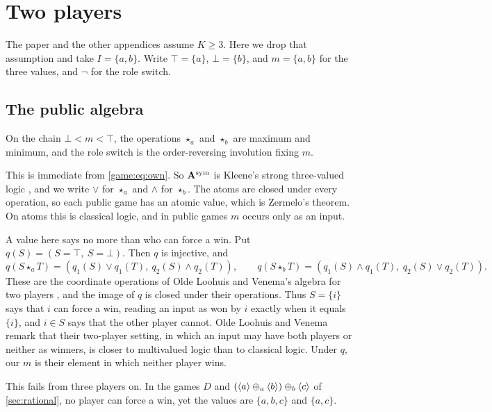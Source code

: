 \section{Two players}\label{app:two-players}

The paper and the other appendices assume $K\geq3$. Here we drop that assumption and take $I=\{a,b\}$. Write $\top=\{a\}$, $\bot=\{b\}$, and $m=\{a,b\}$ for the three values, and $\lnot$ for the role switch.

\subsection{The public algebra}

\begin{proposition}\label{two:prop:kleene}
On the chain $\bot<m<\top$, the operations $\star_a$ and $\star_b$ are maximum and minimum, and the role switch is the order-reversing involution fixing $m$.
\end{proposition}

This is immediate from \eqref{game:eq:own}. So $\mathbf A^{\rm sym}$ is Kleene's strong three-valued logic \cite{Kleene1952}, and we write $\lor$ for $\star_a$ and $\land$ for $\star_b$. The atoms are closed under every operation, so each public game has an atomic value, which is Zermelo's theorem. On atoms this is classical logic, and in public games $m$ occurs only as an input.

A value here says no more than who can force a win. Put $q(S)=(S=\top,\ S=\bot)$. Then $q$ is injective, and
\[
 q(S\star_a T)=(q_1(S)\lor q_1(T),\ q_2(S)\land q_2(T)),\qquad
 q(S\star_b T)=(q_1(S)\land q_1(T),\ q_2(S)\lor q_2(T)).
\]
These are the coordinate operations of Olde Loohuis and Venema's algebra for two players \cite[Definition~3.20]{OldeLoohuisVenema2010}, and the image of $q$ is closed under their operations. Thus $S=\{i\}$ says that $i$ can force a win, reading an input as won by $i$ exactly when it equals $\{i\}$, and $i\in S$ says that the other player cannot. Olde Loohuis and Venema remark that their two-player setting, in which an input may have both players or neither as winners, is closer to multivalued logic than to classical logic. Under $q$, our $m$ is their element in which neither player wins.

This fails from three players on. In the games $D$ and $(\langle a\rangle\mathbin{\oplus_{a}}\langle b\rangle)\mathbin{\oplus_{b}}\langle c\rangle$ of \cref{sec:rational}, no player can force a win, yet the values are $\{a,b,c\}$ and $\{a,c\}$.

